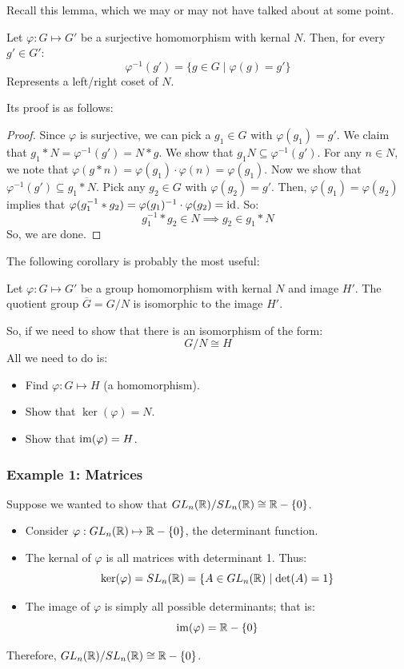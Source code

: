 \documentclass[letterpaper]{article}
\begin{document}
Recall this lemma, which we may or may not have talked about at some point. 
\begin{lemma}{}{}
    Let $\varphi: G \mapsto G'$ be a surjective homomorphism with kernal $N$. Then, for every $g' \in G'$: 
    \[\varphi^{-1}(g') = \{g \in G \mid \varphi(g) = g'\}\]
    Represents a left/right coset of $N$. 
\end{lemma}
Its proof is as follows: 
\begin{mdframed}
    \begin{proof}
        Since $\varphi$ is surjective, we can pick a $g_1 \in G$ with $\varphi(g_1) = g'$. We claim that $g_1 * N = \varphi^{-1}(g') = N * g$. We show that $g_1 N \subseteq \varphi^{-1}(g')$. For any $n \in N$, we note that $\varphi(g * n) = \varphi(g_1) \cdot \varphi(n) = \varphi(g_1)$. Now we show that $\varphi^{-1}(g') \subseteq g_1 * N$. Pick any $g_2 \in G$ with $\varphi(g_2) = g'$. Then, $\varphi(g_1) = \varphi(g_2)$ implies that $\varphi(g_{1}^{-1} * g_2) = \varphi(g_1)^{-1} \cdot \varphi(g_2) = \operatorname{id}$. So:
        \[g_{1}^{-1} * g_2 \in N \implies g_2 \in g_1 * N\]
        So, we are done.  
    \end{proof}
\end{mdframed}

The following corollary is probably the most useful:
\begin{corollary}{}{}
    Let $\varphi: G \mapsto G'$ be a group homomorphism with kernal $N$ and image $H'$. The quotient group $\overline{G} = G / N$ is isomorphic to the image $H'$. 
\end{corollary}

So, if we need to show that there is an isomorphism of the form: 
\[G / N \cong H\]
All we need to do is: 
\begin{itemize}
    \item Find $\varphi: G \mapsto H$ (a homomorphism). 
    \item Show that $\ker(\varphi) = N$. 
    \item Show that $\operatorname{im}(\varphi) = H$. 
\end{itemize}

\subsubsection{Example 1: Matrices}
Suppose we wanted to show that $GL_{n}(\mathbb{R}) / SL_{n}(\mathbb{R}) \cong \mathbb{R} - \{0\}$. 
\begin{itemize}
    \item Consider $\varphi: GL_{n}(\mathbb{R}) \mapsto \mathbb{R} - \{0\}$, the determinant function.
    \item The kernal of $\varphi$ is all matrices with determinant 1. Thus: 
    \[\ker(\varphi) = SL_{n}(\mathbb{R}) = \{A \in GL_{n}(\mathbb{R}) \mid \det(A) = 1\}\]
    \item The image of $\varphi$ is simply all possible determinants; that is: 
    \[\operatorname{im}(\varphi) = \mathbb{R} - \{0\}\]
\end{itemize}
Therefore, $GL_{n}(\mathbb{R}) / SL_{n}(\mathbb{R}) \cong \mathbb{R} - \{0\}$. 
\end{document}
